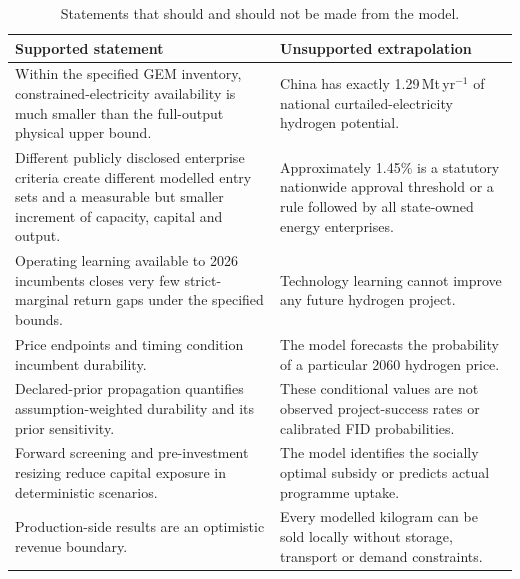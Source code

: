 \documentclass[11pt,a4paper]{article}
\begin{document}
\begin{table}[!h]
\caption{Statements that should and should not be made from the model.}\label{tab:claims}
\centering
\footnotesize
\begin{tabularx}{\textwidth}{>{\raggedright\arraybackslash}X>{\raggedright\arraybackslash}X}
\toprule
Supported statement & Unsupported extrapolation \\
\midrule
Within the specified GEM inventory, constrained-electricity availability is much smaller than the full-output physical upper bound. & China has exactly 1.29\,Mt\,yr$^{-1}$ of national curtailed-electricity hydrogen potential. \\
Different publicly disclosed enterprise criteria create different modelled entry sets and a measurable but smaller increment of capacity, capital and output. & Approximately 1.45\% is a statutory nationwide approval threshold or a rule followed by all state-owned energy enterprises. \\
Operating learning available to 2026 incumbents closes very few strict-marginal return gaps under the specified bounds. & Technology learning cannot improve any future hydrogen project. \\
Price endpoints and timing condition incumbent durability. & The model forecasts the probability of a particular 2060 hydrogen price. \\
Declared-prior propagation quantifies assumption-weighted durability and its prior sensitivity. & These conditional values are not observed project-success rates or calibrated FID probabilities. \\
Forward screening and pre-investment resizing reduce capital exposure in deterministic scenarios. & The model identifies the socially optimal subsidy or predicts actual programme uptake. \\
Production-side results are an optimistic revenue boundary. & Every modelled kilogram can be sold locally without storage, transport or demand constraints. \\
\bottomrule
\end{tabularx}
\end{table}
\FloatBarrier
\end{document}
